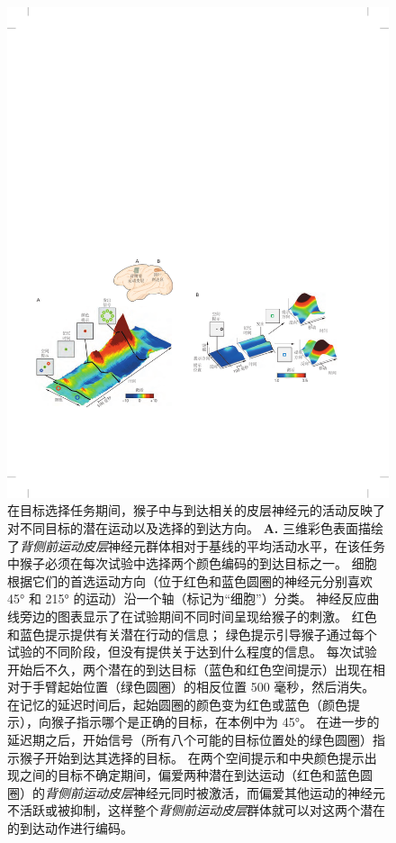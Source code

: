 \begin{figure}[htbp]
	\centering
	\includegraphics[width=1.0\linewidth]{chap34/fig_34_8}
	\caption{在目标选择任务期间，猴子中与到达相关的皮层神经元的活动反映了对不同目标的潜在运动以及选择的到达方向。
		\textbf{A.} 三维彩色表面描绘了\textit{背侧前运动皮层}神经元群体相对于基线的平均活动水平，在该任务中猴子必须在每次试验中选择两个颜色编码的到达目标之一。
		细胞根据它们的首选运动方向（位于红色和蓝色圆圈的神经元分别喜欢 45° 和 215° 的运动）沿一个轴（标记为“细胞”）分类。
		神经反应曲线旁边的图表显示了在试验期间不同时间呈现给猴子的刺激。
		红色和蓝色提示提供有关潜在行动的信息；
		绿色提示引导猴子通过每个试验的不同阶段，但没有提供关于达到什么程度的信息。
		每次试验开始后不久，两个潜在的到达目标（蓝色和红色空间提示）出现在相对于手臂起始位置（绿色圆圈）的相反位置 500 毫秒，然后消失。
		在记忆的延迟时间后，起始圆圈的颜色变为红色或蓝色（颜色提示），向猴子指示哪个是正确的目标，在本例中为 45°。
		在进一步的延迟期之后，开始信号（所有八个可能的目标位置处的绿色圆圈）指示猴子开始到达其选择的目标。
		在两个空间提示和中央颜色提示出现之间的目标不确定期间，偏爱两种潜在到达运动（红色和蓝色圆圈）的\textit{背侧前运动皮层}神经元同时被激活，而偏爱其他运动的神经元不活跃或被抑制，这样整个\textit{背侧前运动皮层}群体就可以对这两个潜在的到达动作进行编码。
}
\end{figure}
